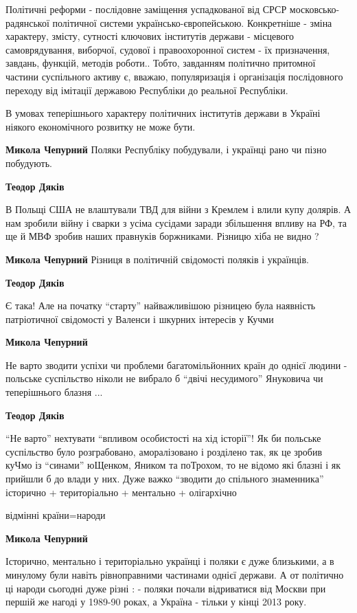 \begin{itemize}
\begin{itemize}
Політичні реформи - послідовне заміщення успадкованої від СРСР
московсько-радянської політичної системи українсько-європейською. Конкретніше -
зміна характеру, змісту, сутності ключових інститутів держави - місцевого
самоврядування, виборчої, судової і правоохоронної систем - їх призначення,
завдань, функцій, методів роботи.. Тобто, завданням політично притомної частини
суспільного активу є, вважаю, популяризація і організація послідовного переходу
від імітації державою Республіки до реальної Республіки.

В умовах теперішнього характеру політичних інститутів держави в Україні ніякого
економічного розвитку не може бути.

\textbf{Микола Чепурний} Поляки Республіку побудували, і українці рано чи пізно побудують.

\textbf{Теодор Дяків} 

В Польщі США не влаштували ТВД для війни з Кремлем і влили купу долярів. А нам
зробили війну і сварки з усіма сусідами заради збільшення впливу на РФ, та ще й
МВФ зробив наших правнуків боржниками. Різницю хіба не видно ?

\textbf{Микола Чепурний} Різниця в політичній свідомості поляків і українців.

\textbf{Теодор Дяків} 

Є така! Але на початку \enquote{старту} найважливішою різницею була наявність
патріотичної свідомості у Валенси і шкурних інтересів у Кучми

\textbf{Микола Чепурний} 

Не варто зводити успіхи чи проблеми багатомільйонних країн до однієї людини -
польське суспільство ніколи не вибрало б \enquote{двічі несудимого} Януковича чи
теперішнього блазня ...

\textbf{Теодор Дяків} 

\enquote{Не варто} нехтувати \enquote{впливом особистості на хід історії}! Як би польське
суспільство було розграбовано, аморалізовано і розділено так, як це зробив
куЧмо із \enquote{синами} юЩенком, Яником та поТрохом, то не відомо які блазні і як
прийшли б до влади у них. Дуже важко \enquote{зводити до спільного знаменника}
історично + територіально + ментально + олігархічно

відмінні країни=народи

\textbf{Микола Чепурний} 

Історично, ментально і територіально українці і поляки є дуже близькими, а в
минулому були навіть рівноправними частинами однієї держави. А от політично ці
народи сьогодні дуже різні : - поляки почали відриватися від Москви при першій
же нагоді у 1989-90 роках, а Україна - тільки у кінці 2013 року.


\end{itemize}
\end{itemize}
